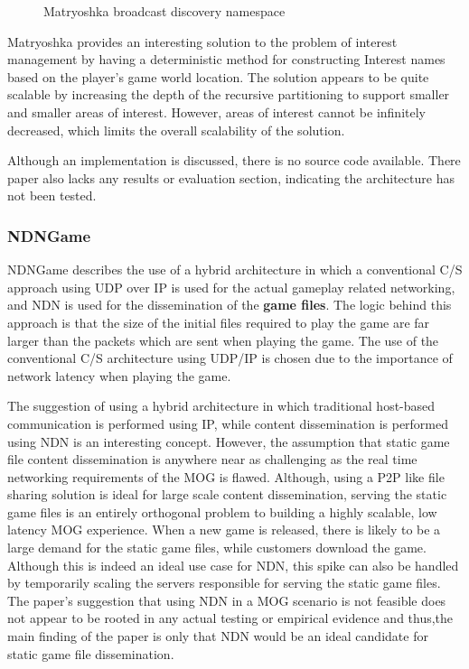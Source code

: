 \begin{figure}[H]
    \centering
    \caption{Matryoshka broadcast discovery namespace \cite{ndn-multiplayer-game}}
    \label{fig:matryoshka-discovery}
\end{figure}

Matryoshka provides an interesting solution to the problem of interest management by having a deterministic method for constructing Interest names based on the player's game world location. The solution appears to be quite scalable by increasing the depth of the recursive partitioning to support smaller and smaller areas of interest. However, areas of interest cannot be infinitely decreased, which limits the overall scalability of the solution. 

Although an implementation is discussed, there is no source code available. There paper also lacks any results or evaluation section, indicating the architecture has not been tested.   

\subsubsection*{NDNGame \cite{ndn-game}}
NDNGame describes the use of a hybrid architecture in which a conventional C/S approach using UDP over IP is used for the actual gameplay related networking, and NDN is used for the dissemination of the \textbf{game files}. The logic behind this approach is that the size of the initial files required to play the game are far larger than the packets which are sent when playing the game. The use of the conventional C/S architecture using UDP/IP is chosen due to the importance of network latency when playing the game. 

The suggestion of using a hybrid architecture in which traditional host-based communication is performed using IP, while content dissemination is performed using NDN is an interesting concept. However, the assumption that static game file content dissemination is anywhere near as challenging as the real time networking requirements of the MOG is flawed. Although, using a P2P like file sharing solution is ideal for large scale content dissemination, serving the static game files is an entirely orthogonal problem to building a highly scalable, low latency MOG experience. When a new game is released, there is likely to be a large demand for the static game files, while customers download the game. Although this is indeed an ideal use case for NDN, this spike can also be handled by temporarily scaling the servers responsible for serving the static game files. The paper's suggestion that using NDN in a MOG scenario is not feasible does not appear to be rooted in any actual testing or empirical evidence and thus,the main finding of the paper is only that NDN would be an ideal candidate for static game file dissemination.  


